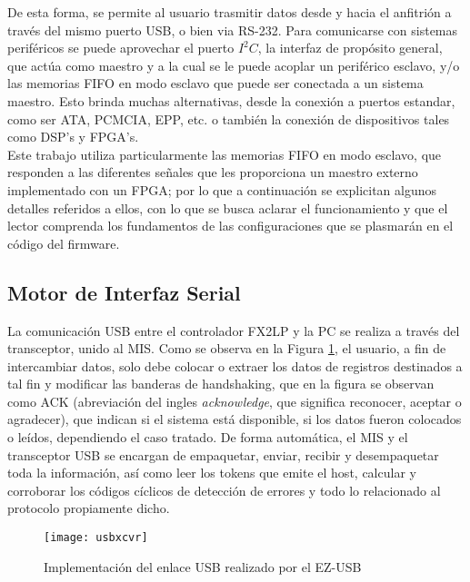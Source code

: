 De esta forma, se permite al usuario trasmitir datos desde y hacia el anfitrión a través del  mismo puerto USB, o bien via RS-232. Para comunicarse con sistemas periféricos se puede aprovechar el puerto $I^2C$, la interfaz de propósito general, que actúa como maestro y a la cual se le puede acoplar un periférico esclavo, y/o las memorias FIFO en modo esclavo que puede ser conectada a un sistema maestro. Esto brinda muchas alternativas, desde la conexión a puertos estandar, como ser ATA, PCMCIA, EPP, etc. o también la conexión de dispositivos tales como DSP's y FPGA's.\\

Este trabajo utiliza particularmente las memorias FIFO en modo esclavo, que responden a las diferentes señales que les proporciona un maestro externo implementado con un FPGA; por lo que a continuación se explicitan algunos detalles referidos a ellos, con lo que se busca aclarar el funcionamiento y que el lector comprenda los fundamentos de las configuraciones que se plasmarán en el código del firmware.\\

\subsection{Motor de Interfaz Serial}

	La comunicación USB entre el controlador FX2LP y la PC se realiza a través del transceptor, unido al MIS. Como se observa en la Figura \ref{usbxcvr}, el usuario, a fin de intercambiar datos, solo debe colocar o extraer los datos de registros destinados a tal fin y modificar las banderas de handshaking, que en la figura se observan como ACK (abreviación del ingles {\it acknowledge}, que significa reconocer, aceptar o agradecer), que indican si el sistema está disponible, si los datos fueron colocados o leídos, dependiendo el caso tratado. De forma automática, el MIS y el transceptor USB se encargan de empaquetar, enviar, recibir y desempaquetar toda la información, así como leer los tokens que emite el host, calcular y corroborar los códigos cíclicos de detección de errores y todo lo relacionado al protocolo propiamente dicho.\\

	\begin{figure}[ht]
		\centering
		\texttt{[image: usbxcvr]}
		\caption{Implementación del enlace USB realizado por el EZ-USB}
		\label{usbxcvr}
	\end{figure}
		
